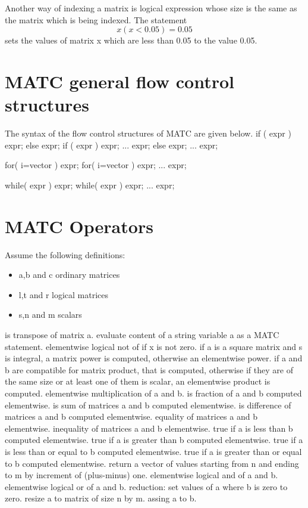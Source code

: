 Another way of indexing a matrix is logical expression whose size is the same as the matrix which is being indexed. The statement 
\[
  x(x < 0.05) = 0.05
\]
sets the values of matrix x which are less than 0.05 to the value 0.05. 



\section{MATC general flow control structures}

The syntax of the flow control structures of MATC are given below. 
\ttbegin
if ( expr ) expr; else expr;
if ( expr )
{
    expr;
    ...
    expr;
} else {
    expr;
    ...
    expr;
}

for( i=vector ) expr;
for( i=vector )
{
    expr;
    ...
    expr;
}

while( expr ) expr;
while( expr )
{
    expr;
    ...
    expr;
}
\ttend



\section{MATC Operators}

Assume the following definitions:
\begin{itemize}
\item a,b and c ordinary matrices  
\item l,t and r logical matrices 
\item s,n and m scalars 
\end{itemize}

\sifbegin
{} is transpose of matrix a. 
 evaluate content of a string variable a as a MATC statement. 
 elementwise logical not of  if x is not zero. 
 if a is a square matrix and s is integral, a matrix power is computed, otherwise an elementwise power. 
 if a and b are compatible for matrix product, that is computed, 
otherwise if they are of the same size or at least one of them is scalar, an elementwise product is computed. 
elementwise multiplication of a and b.  
 is fraction of a and b computed elementwise. 
 is sum of matrices a and b computed elementwise. 
 is difference of matrices a and b computed elementwise. 
 equality of matrices a and b elementwise.  
 inequality of matrices a and b elementwise.  
 true if a is less than b computed elementwise. 
 true if a is greater than b computed elementwise.
 true if a is less than or equal to b computed elementwise. 
 true if a is greater than or equal to b computed elementwise. 
 return a vector of values starting from n and ending to m by increment of (plus-minus) one.  
 elementwise logical and of a and b. 
 elementwise logical or of a and b. 
 reduction: set values of a where b is zero to zero. 
 resize a to matrix of size n by m. 
 assing a to b. 
\sifend


